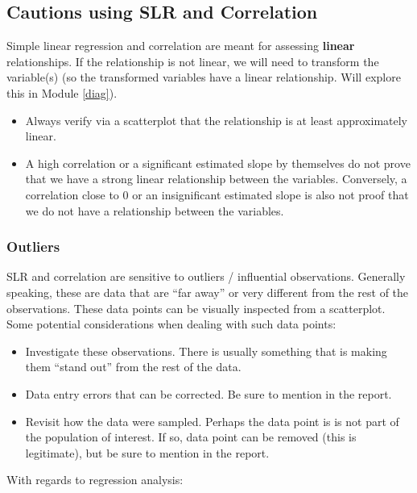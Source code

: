 \documentclass[
]{book}
\providecommand{\tightlist}{%
  \setlength{\itemsep}{0pt}\setlength{\parskip}{0pt}}
\begin{document}
\subsection{Cautions using SLR and Correlation}\label{cautions-using-slr-and-correlation}

Simple linear regression and correlation are meant for assessing \textbf{linear} relationships. If the relationship is not linear, we will need to transform the variable(s) (so the transformed variables have a linear relationship. Will explore this in Module \ref{diag}).

\begin{itemize}
\tightlist
\item
  Always verify via a scatterplot that the relationship is at least approximately linear.
\item
  A high correlation or a significant estimated slope by themselves do not prove that we have a strong linear relationship between the variables. Conversely, a correlation close to 0 or an insignificant estimated slope is also not proof that we do not have a relationship between the variables.
\end{itemize}

\subsubsection{Outliers}\label{outliers}

SLR and correlation are sensitive to outliers / influential observations. Generally speaking, these are data that are ``far away'' or very different from the rest of the observations. These data points can be visually inspected from a scatterplot. Some potential considerations when dealing with such data points:

\begin{itemize}
\tightlist
\item
  Investigate these observations. There is usually something that is making them ``stand out'' from the rest of the data.
\item
  Data entry errors that can be corrected. Be sure to mention in the report.
\item
  Revisit how the data were sampled. Perhaps the data point is is not part of the population of interest. If so, data point can be removed (this is legitimate), but be sure to mention in the report.
\end{itemize}

With regards to regression analysis:
\end{document}
